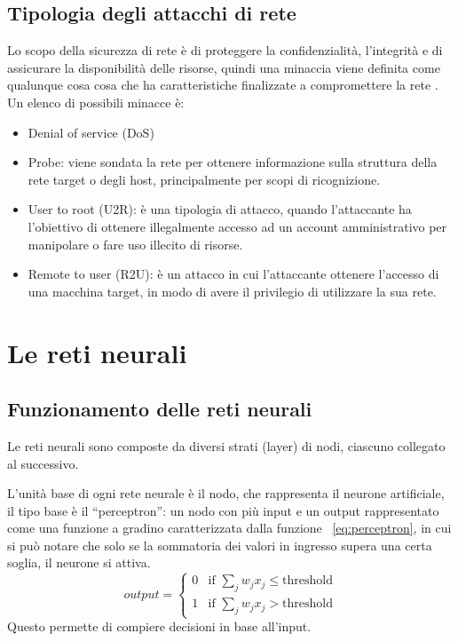 \subsection{Tipologia degli attacchi di rete}
Lo scopo della sicurezza di rete è di proteggere la confidenzialità, l'integrità e di assicurare la disponibilità delle risorse, quindi una minaccia viene definita come qualunque cosa cosa che ha caratteristiche finalizzate a compromettere la rete \cite{anomaly_detection_survey_1_network}. Un elenco di possibili minacce è:

\begin{itemize}
    \item Denial of service (DoS)
    \item Probe: viene sondata la rete per ottenere informazione sulla struttura della rete target o degli host, principalmente per scopi di ricognizione.
    \item User to root (U2R): è una tipologia di attacco, quando l'attaccante ha l'obiettivo di ottenere illegalmente accesso ad un account amministrativo per manipolare o fare uso illecito di risorse.
    \item Remote to user (R2U): è un attacco in cui l'attaccante  ottenere l'accesso di una macchina target, in modo di avere il privilegio di utilizzare la sua rete.
\end{itemize}

\section{Le reti neurali}

\subsection{Funzionamento delle reti neurali}

Le reti neurali sono composte da diversi strati (layer) di nodi, ciascuno collegato al successivo.

L'unità base di ogni rete neurale è il nodo, che rappresenta il neurone artificiale, il tipo base è il ``perceptron'': un nodo con più input e un output rappresentato come una funzione a gradino caratterizzata dalla funzione ~\ref{eq:perceptron}, in cui si può notare che solo se la sommatoria dei valori in ingresso supera una certa soglia, il neurone si attiva.
\[
\label{eq:perceptron}
output = \begin{cases}
    0 & \mbox{if } \sum_{j}{w_{j}x_{j}}\leq \mbox{threshold} \\
    1 &  \mbox{if } \sum_{j}{w_{j}x_{j}} > \mbox{threshold}
\end{cases}
\]
Questo permette di compiere decisioni in base all'input.

